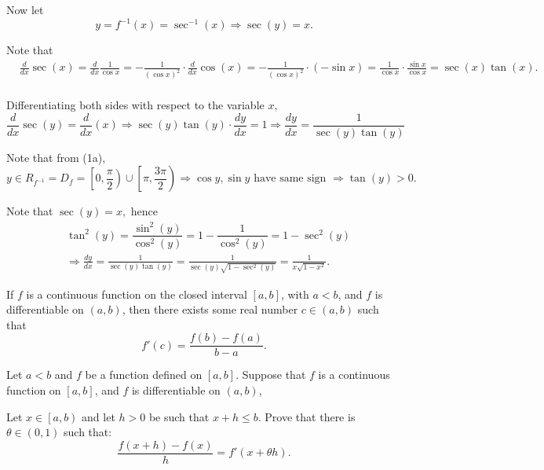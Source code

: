 \documentclass{article}
\begin{document}
\begin{soln}
    Now let
    \[
        y = f^{-1}(x) = \sec^{-1}(x) \Rightarrow \sec(y) = x.
    \]

    Note that
    \[
        \begin{aligned}
            &\frac{d}{dx} \sec(x) = \frac{d}{dx} \frac{1}{\cos{x}} = - \frac{1}{(\cos{x})^2} \cdot \frac{d}{dx} \cos(x)
            = - \frac{1}{(\cos{x})^2} \cdot (- \sin{x}) =  \frac{1}{\cos{x}} \cdot \frac{\sin{x}}{\cos{x}} = \sec(x) \tan(x).\\
        \end{aligned}
    \]

    Differentiating both sides with respect to the variable $x,$
    \[
        \frac{d}{dx} \sec(y) = \frac{d}{dx} (x) 
        \Rightarrow \sec(y) \tan(y) \cdot \frac{dy}{dx} = 1
        \Rightarrow \frac{dy}{dx} = \frac{1}{\sec(y) \tan(y)}
    \]

    Note that from (1a),
    \[
        y \in R_{f^{-1}} = D_f = \left[ 0, \frac{\pi}{2} \right) \cup \left[ \pi, \frac{3\pi}{2} \right)
        \Rightarrow \cos{y}, \sin{y} \text{\ have same sign\ }
        \Rightarrow \tan(y) > 0.
    \]

    Note that $\sec(y) = x,$ hence
    \[
        \begin{aligned}
            &\tan^2(y) = \dfrac{\sin^2(y)}{\cos^2(y)} = 1- \dfrac{1}{\cos^2(y)} = 1 - \sec^2(y)\\
            &\Rightarrow \frac{dy}{dx} = \frac{1}{\sec(y) \tan(y)} = \frac{1}{\sec(y) \sqrt{1-\sec^2(y)}} = \boxed{\frac{1}{x \sqrt{1-x^2}}.}
        \end{aligned}
    \]
\end{soln}

\newpage

\begin{theorem*}
    \label{theorem:mean-value-theorem}
    If $f$ is a continuous function on the closed interval $[a,b]$, with $a<b$, and $f$ is differentiable on $(a,b)$,
    then there exists some real number $c \in (a,b)$ such that 
    \[
        f'(c) = \frac{f(b)-f(a)}{b-a}.
    \]
\end{theorem*}

\begin{problem*}[2a]
    Let $a<b$ and $f$ be a function defined on $[a,b].$ Suppose that $f$ is a continuous function on $[a,b]$, and $f$ is differentiable on $(a,b)$, 

    Let $x \in \left[ a, b \right)$ and let $h > 0$ be such that $x+h \le b.$ Prove that there is $\theta \in (0,1)$ such that:
    \[
        \frac{f(x+h) - f(x)}{h} = f'(x+\theta h).
    \]
\end{problem*}
\end{document}
